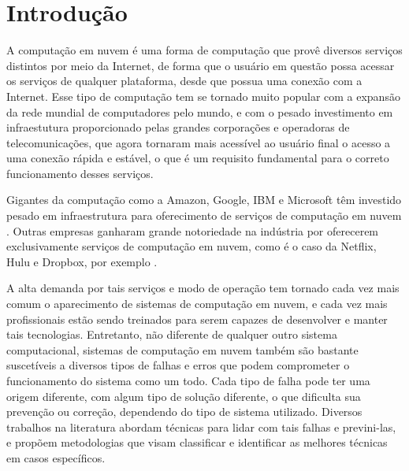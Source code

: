 \documentclass[
	12pt,				%
	a4paper,			%
	english,			%
	french,				%
	spanish,			%
	brazil				%
	]{abntex2}
\begin{document}

\tableofcontents*
\cleardoublepage



\textual

\chapter{Introdução}
A computação em nuvem é uma forma de computação que provê diversos serviços distintos por meio da Internet, de forma que o usuário em questão possa acessar os serviços de qualquer plataforma, desde que possua uma conexão com a Internet. Esse tipo de computação tem se tornado muito popular com a expansão da rede mundial de computadores pelo mundo, e com o pesado investimento em infraestutura proporcionado pelas grandes corporações e operadoras de telecomunicações, que agora tornaram mais acessível ao usuário final o acesso a uma conexão rápida e estável, o que é um requisito fundamental para o correto funcionamento desses serviços.

Gigantes da computação como a Amazon, Google, IBM e Microsoft têm investido pesado em infraestrutura para oferecimento de serviços de computação em nuvem \cite{tsai2010service, lohr2007google}. Outras empresas ganharam grande notoriedade na indústria por oferecerem exclusivamente serviços de computação em nuvem, como é o caso da Netflix, Hulu e Dropbox, por exemplo \cite{berman2012cloud}. 

A alta demanda por tais serviços e modo de operação tem tornado cada vez mais comum o aparecimento de sistemas de computação em nuvem, e cada vez mais profissionais estão sendo treinados para serem capazes de desenvolver e manter tais tecnologias. Entretanto, não diferente de qualquer outro sistema computacional, sistemas de computação em nuvem também são bastante suscetíveis a diversos tipos de falhas e erros que podem comprometer o funcionamento do sistema como um todo. Cada tipo de falha pode ter uma origem diferente, com algum tipo de solução diferente, o que dificulta sua prevenção ou correção, dependendo do tipo de sistema utilizado. Diversos trabalhos na literatura abordam técnicas para lidar com tais falhas e previni-las, e propõem metodologias que visam classificar e identificar as melhores técnicas em casos específicos.
\end{document}
